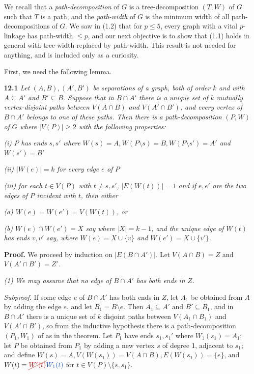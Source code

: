 
We recall that a \textit{path-decomposition} of $G$ is a tree-decomposition $(T, W)$ of $G$ such that $T$ is a path, and the \textit{path-width} of $G$ is the minimum width of all path-decompositions of $G$. We saw in (1.2) that for $p \le 5$, every graph with a vital $p$-linkage has path-width $\le p$, and our next objective is to show that (1.1) holds in general with tree-width replaced by path-width. This result is not needed for anything, and is included only as a curiosity.

First, we need the following lemma.

\textbf{12.1} \textit{Let $(A, B), (A', B')$ be separations of a graph, both of order $k$ and with $A \subseteq A'$ and $B' \subseteq B$. Suppose that in $B \cap A'$ there is a unique set of $k$ mutually vertex-disjoint paths between $V(A \cap B)$ and $V(A' \cap B')$, and every vertex of $B \cap A'$ belongs to one of these paths. Then there is a path-decomposition $(P, W)$ of $G$ where $|V(P)| \ge 2$ with the following properties:}

\textit{(i) $P$ has ends $s, s'$ where $W(s) = A, W(P \setminus s) = B, W(P \setminus s') = A'$ and $W(s') = B'$}

\textit{(ii) $|W(e)| = k$ for every edge $e$ of $P$}

\textit{(iii) for each $t \in V(P)$ with $t \ne s, s'$, $|E(W(t))| = 1$ and if $e, e'$ are the two edges of $P$ incident with $t$, then either}

\textit{(a) $W(e) = W(e') = V(W(t))$, or}

\textit{(b) $W(e) \cap W(e') = X$ say where $|X| = k - 1$, and the unique edge of $W(t)$ has ends $v, v'$ say, where $W(e) = X \cup \{v\}$ and $W(e') = X \cup \{v'\}$.}

\textbf{Proof.} We proceed by induction on $|E(B \cap A')|$. Let $V(A \cap B) = Z$ and $V(A' \cap B') = Z'$.

\textit{(1) We may assume that no edge of $B \cap A'$ has both ends in $Z$.}

\textit{Subproof.} If some edge $e$ of $B \cap A'$ has both ends in $Z$, let $A_1$ be obtained from $A$ by adding the edge $e$, and let $B_1 = B \setminus e$. Then $A_1 \subseteq A'$ and $B' \subseteq B_1$, and in $B \cap A'$ there is a unique set of $k$ disjoint paths between $V(A_1 \cap B_1)$ and $V(A' \cap B')$, so from the inductive hypothesis there is a path-decomposition $(P_1, W_1)$ of  as in the theorem. Let $P_1$ have ends $s_1, s_1'$ where $W_1(s_1) = A_1$; let $P$ be obtained from $P_1$ by adding a new vertex $s$ of degree 1, adjacent to $s_1$; and define $W(s) = A, V(W(s_1)) = V(A \cap B), E(W(s_1)) = \{e\}$, and $W(t) = \delm{W'(t)}\fix{W_1(t)}$ for $t \in V(P) \setminus \{s, s_1\}$.
